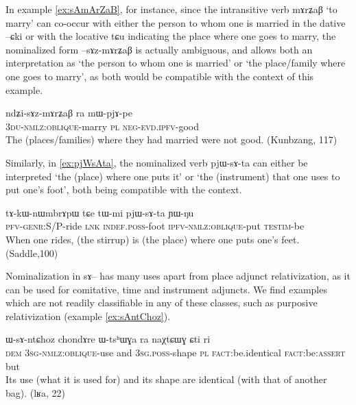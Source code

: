 \documentclass[oldfontcommands,oneside,a4paper,11pt]{article}
\newcommand{\ipa}[1]{{\phon #1}} %
\begin{document}
In example \ref{ex:sAmArZaB}, for instance, since the intransitive verb \ipa{mɤrʑaβ} `to marry' can co-occur with either the person to whom one is married in the dative \ipa{--ɕki} or with the locative \ipa{tɕu} indicating the place where one goes to marry, the nominalized form \ipa{--sɤz-mɤrʑaβ} is actually ambiguous, and allows both an interpretation as `the person to whom one is married' or `the place/family where one goes to marry', as both would be compatible with the context of this example.



\begin{exe}
   \ex \label{ex:sAmArZaB}
 \gll
	\ipa{ndʑi-sɤz-mɤrʑaβ}   	\ipa{ra}   	\ipa{mɯ-pjɤ-pe}   \\
\textsc{3du-nmlz:oblique}-marry \textsc{pl} \textsc{neg-evd.ipfv}-good \\
\glt The (places/families) where they had married were not good. (Kunbzang, 117)
\end{exe}


Similarly, in  \ref{ex:pjWsAta}, the nominalized verb 	\ipa{pjɯ-sɤ-ta}  can either be interpreted `the (place) where one puts it' or `the (instrument) that one uses to put one's foot', both being compatible with the context.

\begin{exe}
   \ex \label{ex:pjWsAta}
 \gll
\ipa{tɤ-kɯ-nɯmbrɤpɯ}   	\ipa{tɕe}   	\ipa{tɯ-mi}   	\ipa{pjɯ-sɤ-ta}   	\ipa{ɲɯ-ŋu}   \\
\textsc{pfv-genr:S/P}-ride \textsc{lnk}  \textsc{indef.poss}-foot \textsc{ipfv-nmlz:oblique}-put \textsc{testim}-be \\
\glt When one rides, (the stirrup) is (the place) where one puts one's feet. (Saddle,100)
\end{exe}


Nominalization in \ipa{sɤ}-- has many uses apart from place adjunct relativization, as it can be used for comitative, time and instrument adjuncts. We find examples which are not readily classifiable in any of these classes, such as purposive relativization (example \ref{ex:sAntChoz}).  

     \begin{exe}
  \ex   \label{ex:sAntChoz}  
\gll \ipa{nɯnɯ}  	\ipa{ɯ-sɤ-ntɕhoz}  	\ipa{chondɤre}  	\ipa{ɯ-tsʰɯɣa}  	\ipa{ra}  	\ipa{naχtɕɯɣ}  	\ipa{ɕti}  	\ipa{ri}  	\\
\textsc{dem} \textsc{3sg-nmlz:oblique}-use and \textsc{3sg.poss}-shape \textsc{pl} \textsc{fact}:be.identical \textsc{fact}:be:\textsc{assert} but \\
\glt  Its use (what it is used for) and its shape are identical (with that of another bag). (lʁa, 22)
   \end{exe} 
\end{document}
